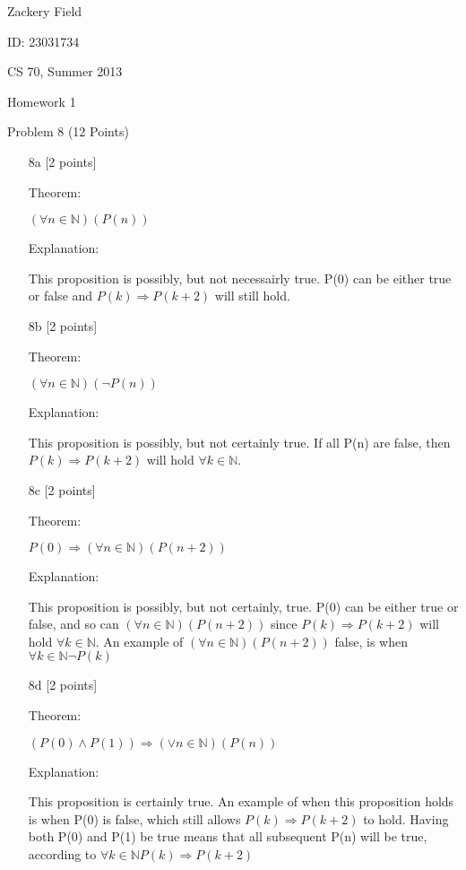 \documentclass[11pt,letterpaper]{article}
\begin{document}
Zackery Field

ID: 23031734

CS 70, Summer 2013

Homework 1 

Problem 8 (12 Points)
\bigskip

\begin{enumerate}

\item[8a] [2 points] 

Theorem:

$(\forall n \in \mathbb{N})(P(n))$

Explanation:

This proposition is possibly, but not necessairly true. P(0) can be either true or false and $P(k) \Rightarrow P(k+2)$ will still hold.

\item[8b] [2 points]

Theorem:

$(\forall n \in \mathbb{N})(\neg P(n))$

Explanation:

This proposition is possibly, but not certainly true. If all P(n) are false, then $P(k) \Rightarrow P(k+2)$ will hold $\forall k \in \mathbb{N}$.

\item[8c] [2 points]

Theorem:

$ P(0) \Rightarrow (\forall n \in \mathbb{N})(P(n+2))$

Explanation:

This proposition is possibly, but not certainly, true. P(0) can be either true or false, and so can $(\forall n \in \mathbb{N})(P(n+2))$  since $P(k) \Rightarrow P(k+2)$ will hold $\forall k \in \mathbb{N}$. An example of  $(\forall n \in \mathbb{N})(P(n+2))$ false, is when $ \forall k \in \mathbb{N} \neg P(k) $

\item[8d] [2 points]

Theorem:

$(P(0) \wedge P(1)) \Rightarrow (\vee n \in \mathbb{N})(P(n))$

Explanation:

This proposition is certainly true. An example of when this proposition holds is when P(0) is false, which still allows  $P(k) \Rightarrow P(k+2)$ to hold. Having both P(0) and P(1) be true means that all subsequent P(n) will be true, according to $\forall k \in \mathbb{N} P(k) \Rightarrow P(k+2)$ 


\end{enumerate}
\end{document}
